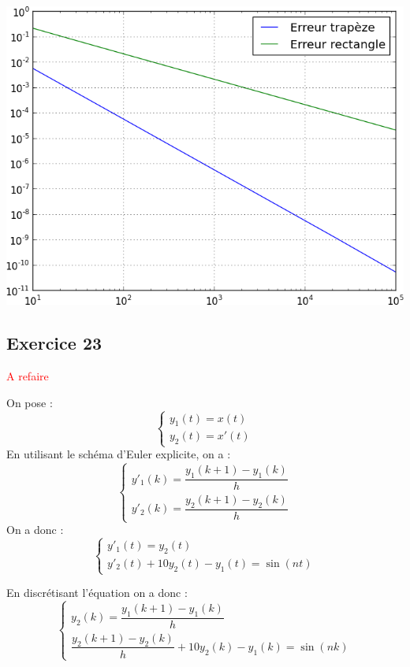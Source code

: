 \documentclass[10pt,fleqn]{article} %
\begin{document}
\begin{multicols}{2}
\begin{corrige}
\begin{python}
\end{python}
\end{corrige}

\begin{center}
\includegraphics[width=.9\linewidth]{images/exo_22}
\end{center}


\columnbreak

\subsection*{Exercice 23}

\begin{corrige}
\textcolor{red}{A refaire}


On pose : 
$$\left\{
\begin{array}{l}
y_1(t) = x(t) \\
y_2(t) = x'(t)
\end{array}
\right.
$$
En utilisant le schéma d'Euler explicite, on a :
$$\left\{
\begin{array}{l}
y'_1(k)=\dfrac{y_1(k+1)-y_1(k)}{h} \\
y'_2(k)=\dfrac{y_2(k+1)-y_2(k)}{h}
\end{array}
\right.
$$
On a donc : 
$$\left\{
\begin{array}{l}
y'_1(t)=y_2(t) \\
y'_2(t)+10y_2(t) - y_1(t) = \sin \left(nt\right)
\end{array}
\right.
$$

En discrétisant l'équation on a donc : 
$$\left\{
\begin{array}{l}
y_2(k) =\dfrac{y_1(k+1)-y_1(k)}{h} \\
\dfrac{y_2(k+1)-y_2(k)}{h} +10y_2(k) - y_1(k) = \sin \left(nk\right)
\end{array}
\right.
$$


\end{corrige}
\end{multicols}
\end{document}
